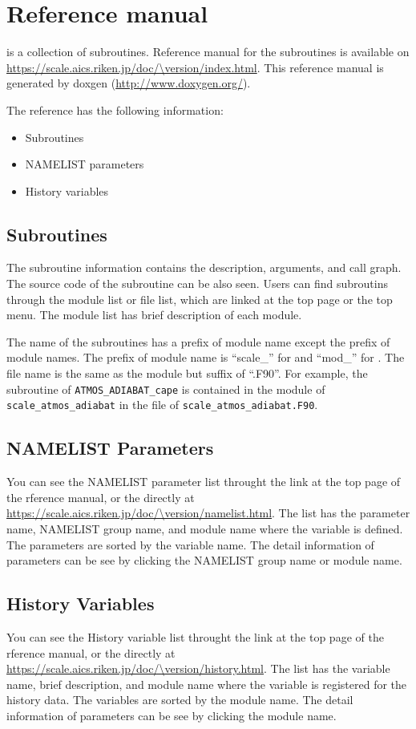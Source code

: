 \section{Reference manual} \label{sec:reference_manual}
\scalelib is a collection of subroutines.
Reference manual for the subroutines is available on
\url{https://scale.aics.riken.jp/doc/\version/index.html}.
This reference manual is generated by doxgen (\url{http://www.doxygen.org/}).

The reference has the following information:
\begin{itemize}
\item Subroutines
\item NAMELIST parameters
\item History variables
\end{itemize}


\subsection{Subroutines}
The subroutine information contains the description, arguments, and call graph.
The source code of the subroutine can be also seen.
Users can find subroutins through the module list or file list, which are linked at the top page or the top menu.
The module list has brief description of each module.

The name of the subroutines has a prefix of module name except the prefix of module names.
The prefix of module name is ``scale\_'' for \scalelib and ``mod\_'' for \scalerm.
The file name is the same as the module but suffix of ``.F90''.
For example, the subroutine of \verb|ATMOS_ADIABAT_cape| is contained in the module of \verb|scale_atmos_adiabat| in the file of \verb|scale_atmos_adiabat.F90|.


\subsection{NAMELIST Parameters}
You can see the NAMELIST parameter list throught the link at the top page of the rference manual, or the directly at \url{https://scale.aics.riken.jp/doc/\version/namelist.html}.
The list has the parameter name, NAMELIST group name, and module name where the variable is defined.
The parameters are sorted by the variable name.
The detail information of parameters can be see by clicking the NAMELIST group name or module name.


\subsection{History Variables}
You can see the History variable list throught the link at the top page of the rference manual, or the directly at \url{https://scale.aics.riken.jp/doc/\version/history.html}.
The list has the variable name, brief description, and module name where the variable is registered for the history data.
The variables are sorted by the module name.
The detail information of parameters can be see by clicking the module name.
